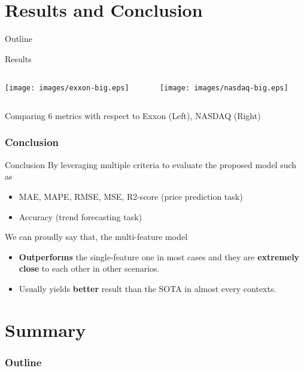 \documentclass[compress, mathserif, fleqn, 10pt]{beamer}
\begin{document}
	\section{Results and Conclusion}
	\begin{frame}{Outline}
		\tableofcontents[currentsection]
	\end{frame}
	
	\begin{frame}{Results}
		\begin{columns}
			\begin{column}{0.5\textwidth}
				\centerline{\texttt{[image: images/exxon-big.eps]}}
			\end{column}
			\begin{column}{0.5\textwidth}
				\centerline{\texttt{[image: images/nasdaq-big.eps]}}
			\end{column}
		\end{columns}
		
		\smallskip
		\centerline{Comparing 6 metrics with respect to Exxon (Left), NASDAQ (Right)}
	\end{frame}
	
	\begin{frame}
		\frametitle{Conclusion}
		\begin{block}{Conclusion}
			\smallskip
			By leveraging multiple criteria to evaluate the proposed model such as
			\begin{itemize}
				\item MAE, MAPE, RMSE, MSE, R2-score (price prediction task)
				\smallskip
				
				\item Accuracy (trend forecasting task)
			\end{itemize}
			\bigskip
			
			We can proudly say that, the multi-feature model
			\begin{itemize}
				\item \textbf{Outperforms} the single-feature one in most cases and they
				are \textbf{extremely close} to each other in other scenarios.
				\smallskip
				
				\item Usually yields \textbf{better} result than the SOTA in almost
				every contexts.
			\end{itemize}
			\smallskip
		\end{block}
	\end{frame}
	
	\section{Summary}
	\begin{frame}
		\frametitle{Outline}
		\tableofcontents[currentsection]
	\end{frame}
	
\end{document}
